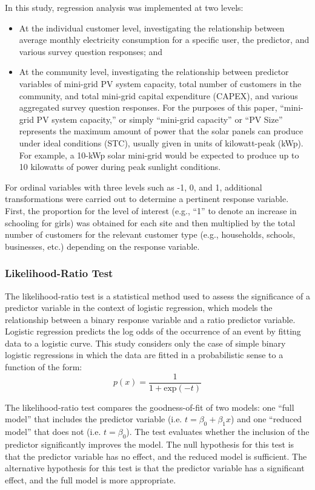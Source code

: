In this study, regression analysis was implemented at two levels:
\begin{itemize}
    \item At the individual customer level, investigating the relationship between average monthly electricity consumption for a specific user, the predictor, and various survey question responses; and
    \item At the community level, investigating the relationship between predictor variables of mini-grid PV system capacity, total number of customers in the community, and total mini-grid capital expenditure (CAPEX), and various aggregated survey question responses. For the purposes of this paper, ``mini-grid PV system capacity,'' or simply ``mini-grid capacity'' or ``PV Size'' represents the maximum amount of power that the solar panels can produce under ideal conditions (STC), usually given in units of kilowatt-peak (kWp). For example, a 10-kWp solar mini-grid would be expected to produce up to 10 kilowatts of power during peak sunlight conditions.
\end{itemize}

For ordinal variables with three levels such as -1, 0, and 1, additional transformations were carried out to determine a pertinent response variable. First, the proportion for the level of interest (e.g., ``1'' to denote an increase in schooling for girls) was obtained for each site and then multiplied by the total number of customers for the relevant customer type (e.g., households, schools, businesses, etc.) depending on the response variable.

\subsubsection{Likelihood-Ratio Test}
\hfill \break
The likelihood-ratio test is a statistical method used to assess the significance of a predictor variable in the context of logistic regression, which models the relationship between a binary response variable and a ratio predictor variable. Logistic regression predicts the log odds of the occurrence of an event by fitting data to a logistic curve. This study considers only the case of simple binary logistic regressions in which the data are fitted in a probabilistic sense to a function of the form:
\begin{equation}
    p(x)=\frac{1}{1+\mathrm{exp}(-t)}
\end{equation}

The likelihood-ratio test compares the goodness-of-fit of two models: one ``full model'' that includes the predictor variable (i.e. $t=\beta_0+\beta_1x$) and one ``reduced model'' that does not (i.e. $t=\beta_0$). The test evaluates whether the inclusion of the predictor significantly improves the model. The null hypothesis for this test is that the predictor variable has no effect, and the reduced model is sufficient. The alternative hypothesis for this test is that the predictor variable has a significant effect, and the full model is more appropriate.

